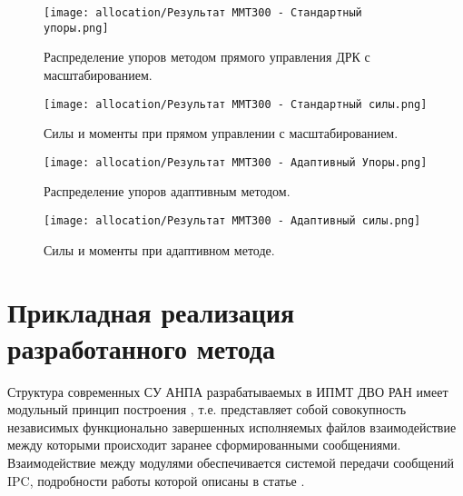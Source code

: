 \begin{figure}[ht]
    \centering
    \texttt{[image: allocation/Результат ММТ300 - Стандартный упоры.png]}
    \caption{Распределение упоров методом прямого управления ДРК с масштабированием.}
    \label{fig:mmt-300-allocation-fix-thrust}
\end{figure}

\begin{figure}[ht]
    \centering
    \texttt{[image: allocation/Результат ММТ300 - Стандартный силы.png]}
    \caption{Силы и моменты при прямом управлении с масштабированием.}
    \label{fig:mmt-300-allocation-fix-force}
\end{figure}

\begin{figure}[ht]
    \centering
    \texttt{[image: allocation/Результат ММТ300 - Адаптивный Упоры.png]}
    \caption{Распределение упоров адаптивным методом.}
    \label{fig:mmt-300-allocation-optimal-thrust}
\end{figure}

\begin{figure}[ht]
    \centering
    \texttt{[image: allocation/Результат ММТ300 - Адаптивный силы.png]}
    \caption{Силы и моменты при адаптивном методе.}
    \label{fig:mmt-300-allocation-optimal-force}
\end{figure}

\section{Прикладная реализация разработанного метода} \label{sec:Allocation/Software}
Структура современных СУ АНПА разрабатываемых в ИПМТ ДВО РАН имеет модульный принцип построения \cite{борейко2019система, инзарцев2015реконфигурируемая}, т.е. представляет собой совокупность независимых функционально завершенных исполняемых файлов взаимодействие между которыми происходит заранее сформированными сообщениями.
Взаимодействие между модулями обеспечивается системой передачи сообщений IPC, подробности работы которой описаны в статье \cite{pavin2016reconfigurable}.

